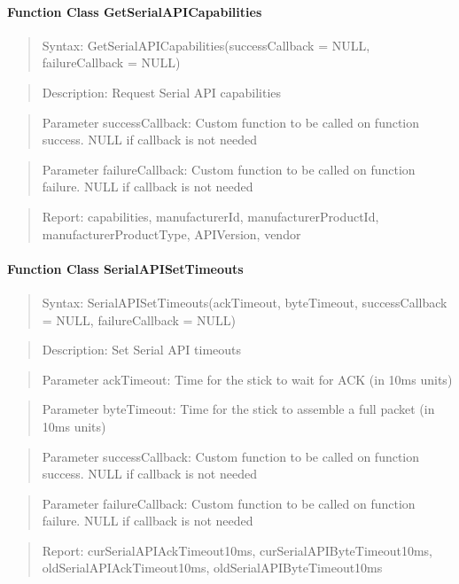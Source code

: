 
\paragraph{Function Class GetSerialAPICapabilities}
\begin{quote}Syntax: GetSerialAPICapabilities(successCallback = NULL, failureCallback = NULL)\end{quote}
\begin{quote}Description: Request Serial API capabilities\end{quote}
\begin{quote}Parameter successCallback: Custom function to be called on function success. NULL if callback is not needed\end{quote}
\begin{quote}Parameter failureCallback: Custom function to be called on function failure. NULL if callback is not needed\end{quote}
\begin{quote}Report: capabilities, manufacturerId, manufacturerProductId, manufacturerProductType, APIVersion, vendor\end{quote}

\paragraph{Function Class SerialAPISetTimeouts}
\begin{quote}Syntax: SerialAPISetTimeouts(ackTimeout, byteTimeout, successCallback = NULL, failureCallback = NULL)\end{quote}
\begin{quote}Description: Set Serial API timeouts\end{quote}
\begin{quote}Parameter ackTimeout: Time for the stick to wait for ACK (in 10ms units)\end{quote}
\begin{quote}Parameter byteTimeout: Time for the stick to assemble a full packet (in 10ms units)\end{quote}
\begin{quote}Parameter successCallback: Custom function to be called on function success. NULL if callback is not needed\end{quote}
\begin{quote}Parameter failureCallback: Custom function to be called on function failure. NULL if callback is not needed\end{quote}
\begin{quote}Report: curSerialAPIAckTimeout10ms, curSerialAPIByteTimeout10ms, oldSerialAPIAckTimeout10ms, oldSerialAPIByteTimeout10ms\end{quote}

